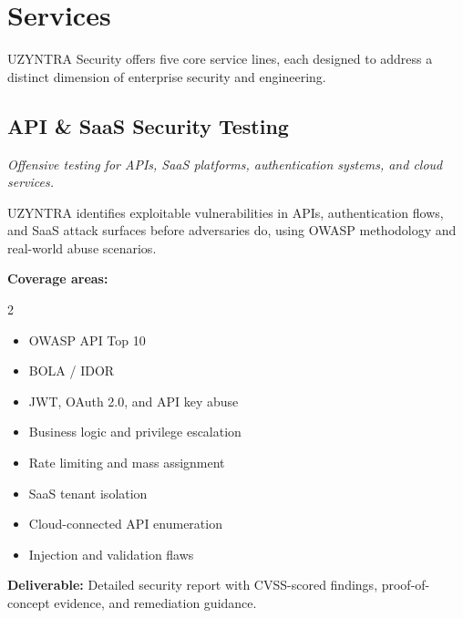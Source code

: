 \documentclass[11pt,a4paper]{article}
\begin{document}
\section{Services}
UZYNTRA Security offers five core service lines, each designed to address a distinct dimension of enterprise security and engineering.

\subsection{API \& SaaS Security Testing}
\begin{redbar}\textit{Offensive testing for APIs, SaaS platforms, authentication systems, and cloud services.}\end{redbar}
UZYNTRA identifies exploitable vulnerabilities in APIs, authentication flows, and SaaS attack surfaces before adversaries do, using OWASP methodology and real-world abuse scenarios.

\textbf{Coverage areas:}
\begin{multicols}{2}
\begin{itemize}
  \item OWASP API Top 10
  \item BOLA / IDOR
  \item JWT, OAuth 2.0, and API key abuse
  \item Business logic and privilege escalation
  \item Rate limiting and mass assignment
  \item SaaS tenant isolation
  \item Cloud-connected API enumeration
  \item Injection and validation flaws
\end{itemize}
\end{multicols}
\textbf{Deliverable:} Detailed security report with CVSS-scored findings, proof-of-concept evidence, and remediation guidance.
\end{document}
